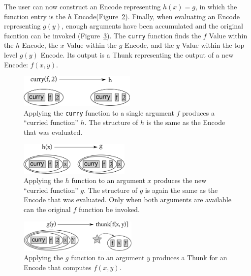 \documentclass{article}
\newcommand{\valuex}{\textrm{Value}\xspace}
\newcommand{\encode}{\textrm{Encode}\xspace}
\newcommand{\thunk}{\textrm{Thunk}\xspace}
\begin{document}
The user can now construct an \encode representing $h(x) = g$, in
which the function entry is the $h$ \encode (Figure~\ref{fig:curry2}).
Finally, when evaluating an \encode representing $g(y)$, enough
arguments have been accumulated and the original fucntion can be
invoked (Figure~\ref{fig:curry3}). The \texttt{curry} function finds
the $f$ \valuex within the $h$ \encode, the $x$ \valuex within the $g$
\encode, and the $y$ \valuex within the top-level $g(y)$ \encode.  Its
output is a \thunk representing the output of a new \encode: $f(x,y)$.

\begin{figure}[h!]
  \begin{centering}
    \includegraphics[height=60px]{curry1.pdf}

  \end{centering}

  \caption{Applying the \texttt{curry} function to a single argument $f$ produces a ``curried function'' $h$. The structure of $h$ is the same as the \encode that was evaluated.}
  \label{fig:curry1}
\end{figure}

\enlargethispage{3 \baselineskip}

\begin{figure}[h!]
  \begin{centering}
    \includegraphics[height=60px]{curry2.pdf}

  \end{centering}

  \caption{Applying the $h$ function to an argument $x$ produces the new ``curried function'' $g$. The structure of $g$ is again the same as the \encode that was evaluated. Only
  when both arguments are available can the original $f$ function be invoked.}
  \label{fig:curry2}
\end{figure}

\begin{figure}[h!]
  \begin{centering}
    \includegraphics[height=60px]{curry3.pdf}

  \end{centering}

  \caption{Applying the $g$ function to an argument $y$ produces a \thunk for an \encode that computes $f(x, y)$.}
  \label{fig:curry3}
\end{figure}
\end{document}
